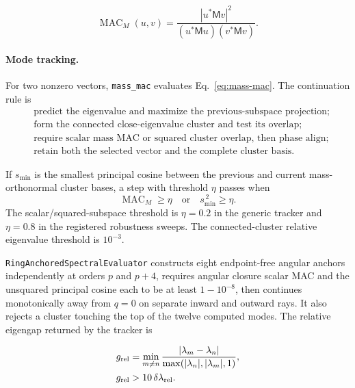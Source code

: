 \begin{equation}
 \operatorname{MAC}_M(u,v)
 =\frac{|u^*\mathsf Mv|^2}{(u^*\mathsf Mu)(v^*\mathsf Mv)}.
 \label{eq:mass-mac}
\end{equation}

\paragraph{Mode tracking.}
For two nonzero vectors, \texttt{mass\_mac} evaluates
Eq.~\eqref{eq:mass-mac}.  The continuation rule is
\begin{equation}
 \boxed{\begin{aligned}
 &\text{predict the eigenvalue and maximize the previous-subspace projection;}\\
 &\text{form the connected close-eigenvalue cluster and test its overlap;}\\
 &\text{require scalar mass MAC or squared cluster overlap, then phase align;}\\
 &\text{retain both the selected vector and the complete cluster basis.}
 \end{aligned}}
 \label{alg:mode-tracking}
\end{equation}

If \(s_{\min}\) is the smallest principal cosine between the previous and
current mass-orthonormal cluster bases, a step with threshold \(\eta\) passes
when
\[
 \operatorname{MAC}_M\geq\eta
 \quad\text{or}\quad s_{\min}^{\,2}\geq\eta .
\]
The scalar/squared-subspace threshold is \(\eta=0.2\) in the generic tracker
and \(\eta=0.8\) in the registered robustness sweeps.  The connected-cluster
relative eigenvalue threshold is \(10^{-3}\).

\texttt{RingAnchoredSpectralEvaluator} constructs eight
endpoint-free angular anchors independently at orders \(p\) and \(p+4\),
requires angular closure scalar MAC and the unsquared principal cosine each
to be at least \(1-10^{-8}\),
then continues monotonically away from \(q=0\) on separate inward and outward
rays.  It also rejects a cluster touching the top of the twelve computed
modes.  The relative eigengap returned by the tracker is

\begin{equation}
 \begin{aligned}
 g_{\rm rel}
 &=\min_{m\ne n}\frac{|\lambda_m-\lambda_n|}
 {\max(|\lambda_n|,|\lambda_m|,1)},\\
 g_{\rm rel}&>10\,\delta\lambda_{\rm rel}.
 \end{aligned}
 \label{eq:eigengap-rejection}
\end{equation}

